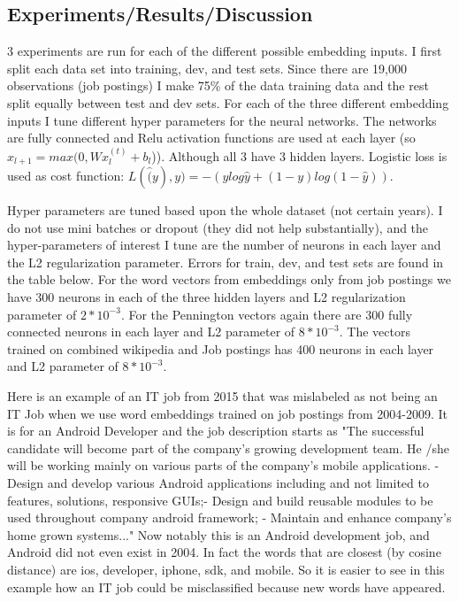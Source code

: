 \documentclass[11pt, oneside]{article}   	%
\begin{document}
\subsection{Experiments/Results/Discussion}

3 experiments are run for each of the different possible embedding inputs. I first split each data set into training, dev, and test sets. Since there are 19,000 observations (job postings) I make 75\% of the data training data and the rest split equally between test and dev sets. For each of the three different embedding inputs I tune different hyper parameters for the neural networks. The networks are fully connected and Relu activation functions are used at each layer (so $x_{l+1} = max(0,Wx^{(t)}_l+ b_l$)). Although all 3 have 3 hidden layers. Logistic loss is used as cost function: $L(\hat(y),y)=-(ylog\hat{y} + (1-y)log(1-\hat{y}))$.

Hyper parameters are tuned based upon the whole dataset (not certain years). I do not use mini batches or dropout (they did not help substantially), and the hyper-parameters of interest I tune are the number of neurons in each layer and the L2 regularization parameter. Errors for train, dev, and test sets are found in the table below. For the word vectors from embeddings only from job postings we have 300 neurons in each of the three hidden layers and L2 regularization parameter of $2*10^{-3}$. For the Pennington vectors again there are 300 fully connected neurons in each layer and L2 parameter of $8*10^{-3}$. The vectors trained on combined wikipedia and Job postings has 400 neurons in each layer and L2 parameter of $8*10^{-3}$.



Here is an example of an IT job from 2015 that was mislabeled as not being an IT Job when we use word embeddings trained on job postings from 2004-2009. It is for an Android Developer and the job description starts as "The successful candidate will become part of the company's growing development team. He /she will be working mainly on various parts of the company's mobile applications. - Design and develop various Android applications including and not limited to features, solutions, responsive GUIs;- Design and build reusable modules to be used throughout company android framework; - Maintain and enhance company's home grown systems..." Now notably this is an Android development job, and Android did not even exist in 2004. In fact the words that are closest (by cosine distance) are  ios,   developer,      iphone,         sdk, and      mobile. So it is easier to see in this example how an IT job could be misclassified because new words have appeared.
\end{document}
